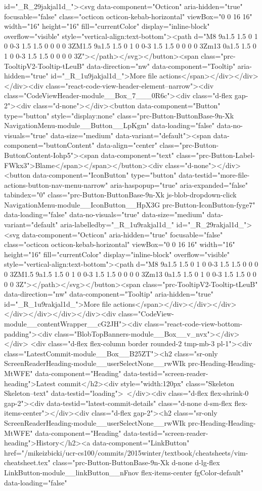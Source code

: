 {{{{{id="_R_29jakjal1d_"><svg data-component="Octicon" aria-hidden="true" focusable="false" class="octicon octicon-kebab-horizontal" viewBox="0 0 16 16" width="16" height="16" fill="currentColor" display="inline-block" overflow="visible" style="vertical-align:text-bottom"><path d="M8 9a1.5 1.5 0 1 0 0-3 1.5 1.5 0 0 0 0 3ZM1.5 9a1.5 1.5 0 1 0 0-3 1.5 1.5 0 0 0 0 3Zm13 0a1.5 1.5 0 1 0 0-3 1.5 1.5 0 0 0 0 3Z"></path></svg></button><span class="prc-TooltipV2-Tooltip-tLeuB" data-direction="nw" data-component="Tooltip" aria-hidden="true" id="_R_1u9jakjal1d_">More file actions</span></div></div></div><div class="react-code-view-header-element--narrow"><div class="CodeViewHeader-module__Box_7___0R6c"><div class="d-flex gap-2"><div class="d-none"></div><button data-component="Button" type="button" style="display:none" class="prc-Button-ButtonBase-9n-Xk NavigationMenu-module__Button__LpKgm" data-loading="false" data-no-visuals="true" data-size="medium" data-variant="default"><span data-component="buttonContent" data-align="center" class="prc-Button-ButtonContent-Iohp5"><span data-component="text" class="prc-Button-Label-FWkx3">Blame</span></span></button><div class="d-none"></div><button data-component="IconButton" type="button" data-testid="more-file-actions-button-nav-menu-narrow" aria-haspopup="true" aria-expanded="false" tabindex="0" class="prc-Button-ButtonBase-9n-Xk js-blob-dropdown-click NavigationMenu-module__IconButton__HpX3G prc-Button-IconButton-fyge7" data-loading="false" data-no-visuals="true" data-size="medium" data-variant="default" aria-labelledby="_R_1u9rakjal1d_" id="_R_29rakjal1d_"><svg data-component="Octicon" aria-hidden="true" focusable="false" class="octicon octicon-kebab-horizontal" viewBox="0 0 16 16" width="16" height="16" fill="currentColor" display="inline-block" overflow="visible" style="vertical-align:text-bottom"><path d="M8 9a1.5 1.5 0 1 0 0-3 1.5 1.5 0 0 0 0 3ZM1.5 9a1.5 1.5 0 1 0 0-3 1.5 1.5 0 0 0 0 3Zm13 0a1.5 1.5 0 1 0 0-3 1.5 1.5 0 0 0 0 3Z"></path></svg></button><span class="prc-TooltipV2-Tooltip-tLeuB" data-direction="nw" data-component="Tooltip" aria-hidden="true" id="_R_1u9rakjal1d_">More file actions</span></div></div></div></div></div></div></div><div class="CodeView-module__contentWrapper__cG2JH"><div class="react-code-view-bottom-padding"><div class="BlobTopBanners-module__Box__v_nvx"></div></div> <div class="d-flex flex-column border rounded-2 tmp-mb-3 pl-1"><div class="LatestCommit-module__Box__B25ZT"><h2 class="sr-only ScreenReaderHeading-module__userSelectNone__rwWIk prc-Heading-Heading-MtWFE" data-component="Heading" data-testid="screen-reader-heading">Latest commit</h2><div style="width:120px" class="Skeleton Skeleton--text" data-testid="loading"> </div><div class="d-flex flex-shrink-0 gap-2"><div data-testid="latest-commit-details" class="d-none d-sm-flex flex-items-center"></div><div class="d-flex gap-2"><h2 class="sr-only ScreenReaderHeading-module__userSelectNone__rwWIk prc-Heading-Heading-MtWFE" data-component="Heading" data-testid="screen-reader-heading">History</h2><a data-component="LinkButton" href="/mikeizbicki/ucr-cs100/commits/2015winter/textbook/cheatsheets/vim-cheatsheet.tex" class="prc-Button-ButtonBase-9n-Xk d-none d-lg-flex LinkButton-module__linkButton__nFnov flex-items-center fgColor-default" data-loading="false" }}}}}

